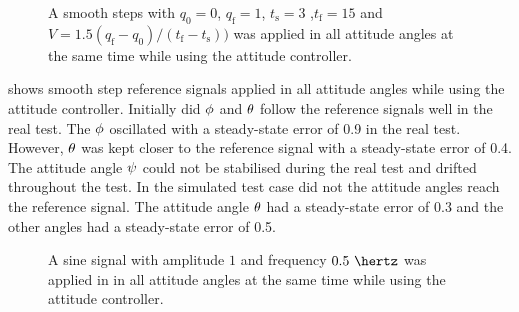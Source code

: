 \begin{figure}
\centering
  \qquad
  \qquad
  \qquad
  \qquad
  \qquad
  \caption{\label{fig:StepAllAttitude}%
 A smooth steps with $q_{\text{0}} = 0$, $q_{\text{f}} = 1$, $t_{\text{s}} = 3$ ,$t_{\text{f}} = 15$ and $V = 1.5 (q_{\text{f}} - q_{\text{0}})/(t_{\text{f}} - t_{\text{s}}))$ was applied in all attitude angles at the same time while using the attitude controller.}
\end{figure}

 shows smooth step reference signals applied in all attitude angles while using the attitude controller. Initially did $\phi$ and $\theta$ follow the reference signals well in the real test. The $\phi$ oscillated with a steady-state error of 0.9 in the real test. However, $\theta$ was kept closer to the reference signal with a steady-state error of 0.4. The attitude angle $\psi$ could not be stabilised during the real test and drifted throughout the test. In the simulated test case did not the attitude angles reach the reference signal. The attitude angle $\theta$ had a steady-state error of 0.3 and the other angles had a steady-state error of 0.5.

\begin{figure}
\centering
  \qquad
  \qquad
  \qquad
  \qquad
  \qquad
  \caption{\label{fig:SinAllAttitude}%
   A sine signal with amplitude $1$ and frequency $0.5\ \hertz$ was applied in in all attitude angles at the same time while using the attitude controller.}
\end{figure}

